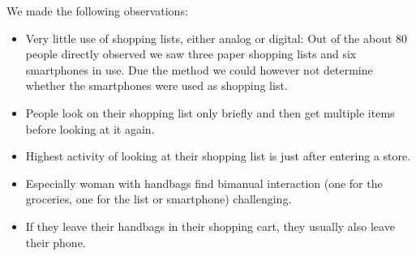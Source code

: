 \documentclass{scrartcl}
\begin{document}
      We made the following observations:
      \begin{itemize}
        \item Very little use of shopping lists, either analog or digital: Out of the about 80 people directly observed we saw three paper shopping lists and six smartphones in use. 
          Due the method we could however not determine whether the smartphones were used as shopping list.
        \item People look on their shopping list only briefly and then get multiple items before looking at it again.
        \item Highest activity of looking at their shopping list is just after entering a store.
        \item Especially woman with handbags find bimanual interaction (one for the groceries, one for the list or smartphone) challenging.
        \item If they leave their handbags in their shopping cart, they usually also leave their phone.
      \end{itemize}
\end{document}
